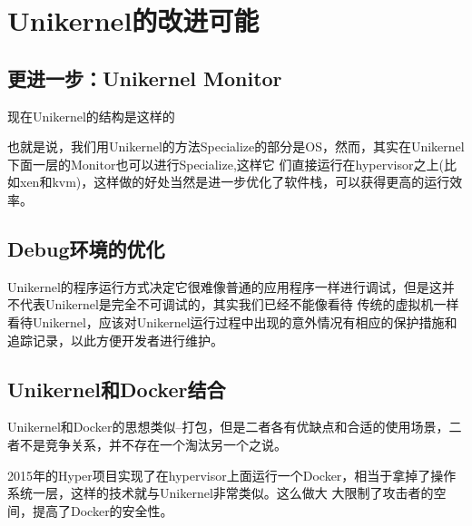 \chapter{Unikernel的改进可能}

\section{更进一步：Unikernel Monitor}

现在Unikernel的结构是这样的

也就是说，我们用Unikernel的方法Specialize的部分是OS，然而，其实在Unikernel下面一层的Monitor也可以进行Specialize,这样它
们直接运行在hypervisor之上(比如xen和kvm)，这样做的好处当然是进一步优化了软件栈，可以获得更高的运行效率。

\section{Debug环境的优化}

Unikernel的程序运行方式决定它很难像普通的应用程序一样进行调试，但是这并不代表Unikernel是完全不可调试的，其实我们已经不能像看待
传统的虚拟机一样看待Unikernel，应该对Unikernel运行过程中出现的意外情况有相应的保护措施和追踪记录，以此方便开发者进行维护。

\section{Unikernel和Docker结合}

Unikernel和Docker的思想类似--打包，但是二者各有优缺点和合适的使用场景，二者不是竞争关系，并不存在一个淘汰另一个之说。

2015年的Hyper项目实现了在hypervisor上面运行一个Docker，相当于拿掉了操作系统一层，这样的技术就与Unikernel非常类似。这么做大
大限制了攻击者的空间，提高了Docker的安全性。